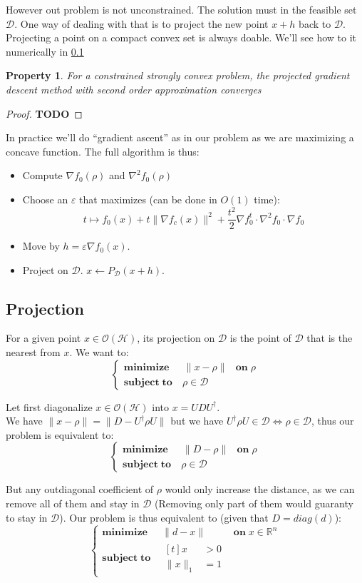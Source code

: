 \documentclass[10pt]{report}
\theoremstyle{plain}
\newtheorem{prop}[thm]{Property}
\theoremstyle{definition}
\theoremstyle{remark}
\newcommand{\R}{\ensuremath{\mathbb{R}}}
\newcommand{\TODO}{\textbf{TODO}}
\newcommand{\minim}[3]{\begin{cases}
    \mathbf{minimize}\;\,\quad #1& \mathbf{on}\; #2\\
    \mathbf{subject\;to}\quad #3
  \end{cases}}
\newcommand{\minima}[3]{\begin{cases}
    \mathbf{minimize}\;\,\quad #1& \mathbf{on}\; #2\\
    \mathbf{subject\;to}\quad \begin{aligned}[t]#3\end{aligned}
  \end{cases}}
\begin{document}
However out problem is not unconstrained. The solution must in the feasible set
$\mathcal{D}$. One way of dealing with that is to project the new point $x + h$
back to $\mathcal{D}$. Projecting a point on a compact convex set is always
doable. We'll see how to it numerically in \cref{ssec:proj}

\begin{prop}
  For a constrained strongly convex problem, the projected gradient descent
  method with second order approximation converges
\end{prop}

\begin{proof}
  \TODO{}
\end{proof}

In practice we'll do ``gradient ascent'' as in our problem as we are maximizing a
concave function. The full algorithm is thus:

\begin{itemize}
\item Compute $\nabla f_0(\rho)$ and $\nabla^2 f_0(\rho)$
\item Choose an $\varepsilon$ that maximizes (can be done in $O(1)$ time):
  \[t \mapsto f_0(x) + t\|\nabla f_c(x)\|^2 + \frac {t^2} 2 \nabla f_0^t \cdot
  \nabla^2\!f_0 \cdot \nabla f_0\]
\item Move by $h = \varepsilon \nabla f_0(x)$.
\item Project on $\mathcal{D}$. $x \leftarrow P_\mathcal{D}(x+h)$.
\end{itemize}

\subsection{Projection}\label{ssec:proj}

For a given point $x \in \mathcal{O}(\mathcal{H})$, its projection on
$\mathcal{D}$ is the point of $\mathcal{D}$ that is the nearest from $x$. We
want to:
\[\minim{\|x - \rho\|}{\rho}{\rho \in \mathcal{D}}\]

Let first diagonalize $x \in \mathcal{O}(\mathcal{H})$ into $x = UDU^\dagger$.\\
We have $\|x - \rho\| = \|D - U^\dagger \rho U\|$ but we have
$U^\dagger \rho U \in \mathcal{D}\iff
\rho \in \mathcal{D}$, thus our problem is equivalent to:
\[\minim{\|D - \rho\|}{\rho}{\rho \in \mathcal{D}}\]

But any outdiagonal coefficient of $\rho$ would only increase the distance, as
we can remove all of them and stay in $\mathcal{D}$ (Removing only part of them
would guaranty to stay in $\mathcal{D}$). Our problem is thus equivalent to
(given that $D = diag(d)$):
\[\minima{\|d - x\|}{x \in\R^n}{ x&>0\\ \|x\|_1 &= 1}\]
\end{document}
